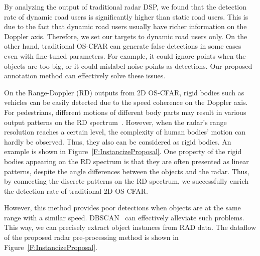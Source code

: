 \documentclass[10pt, conference, compsocconf]{IEEEtran}
\begin{document}


By analyzing the output of traditional radar DSP, we found that the detection rate of dynamic road users is significantly higher than static road users. This is due to the fact that dynamic road users usually have richer information on the Doppler axis. Therefore, we set our targets to dynamic road users only. On the other hand, traditional OS-CFAR can generate false detections in some cases even with fine-tuned parameters. For example, it could ignore points when the objects are too big, or it could mislabel noise points as detections. Our proposed annotation method can effectively solve these issues.

On the Range-Doppler (RD) outputs from 2D OS-CFAR, rigid bodies such as vehicles can be easily detected due to the speed coherence on the Doppler axis. For pedestrians, different motions of different body parts may result in various output patterns on the RD spectrum~\cite{Ref:DeepRadarDetector}. However, when the radar's range resolution reaches a certain level, the complexity of human bodies' motion can hardly be observed. Thus, they also can be considered as rigid bodies. An example is shown in Figure~\ref{F:InstancizeProposal}. One property of the rigid bodies appearing on the RD spectrum is that they are often presented as linear patterns, despite the angle differences between the objects and the radar. Thus, by connecting the discrete patterns on the RD spectrum, we successfully enrich the detection rate of traditional 2D OS-CFAR.

However, this method provides poor detections when objects are at the same range with a similar speed. DBSCAN~\cite{BG:DBSCAN} can effectively alleviate such problems. This way, we can precisely extract object instances from RAD data. 
The dataflow of the proposed radar pre-processing method is shown in Figure~\ref{F:InstancizeProposal}.
\end{document}
